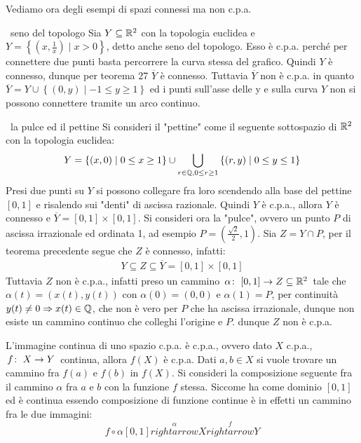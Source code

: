 Vediamo ora degli esempi di spazi connessi ma non c.p.a.
\begin{example}~{seno del topologo}
	Sia $Y\subseteq \mathbb{R}^2$ con la topologia euclidea e $Y=\left\{ \left( x, \frac{1}{x} \right) \mid x>0 \right\}$, detto anche seno del topologo. Esso è c.p.a. perché per connettere due punti basta percorrere la curva stessa del grafico. Quindi $Y$ è connesso, dunque per teorema 27 $\overline{Y}$ è connesso. 
	Tuttavia $\overline{Y}$ non è c.p.a. in quanto $\overline{Y}=Y\cup \left\{ (0,y) \mid -1\leq y \geq 1 \right\}$ ed i punti sull'asse delle y  e sulla curva $Y$ non si possono connettere tramite un arco continuo.
\end{example}
\begin{example}~{la pulce ed il pettine}
	Si consideri il "pettine" come il seguente sottospazio di $\mathbb{R} ^2$ con la topologia euclidea:
		\begin{equation*}
			Y= \left\{ (x,0) \mid 0\leq x\geq 1 \right\} \cup \mathop{{\bigcup}}\displaylimits_{r\in\mathbb{Q}, 0\leq r\geq 1} \left\{ (r,y) \mid 0\leq y \leq 1 \right\}
		\end{equation*}
	Presi due punti su $Y$ si possono collegare fra loro scendendo alla base del pettine $[0,1]$ e risalendo sui "denti" di ascissa razionale. Quindi $Y$ è c.p.a., allora $Y$ è connesso e $\overline{Y}=[0,1]\times [0,1]$.\newline 
	Si consideri ora la "pulce", ovvero un punto $P$ di ascissa irrazionale ed ordinata 1, ad esempio $P=\left(\frac{\sqrt{2}}{2}, 1\right)$. Sia $Z=Y\cap P$, per il teorema precedente segue che $Z$ è connesso, infatti:
		\begin{gather*}
			Y\subseteq Z \subseteq \overline{Y}=[0,1]\times [0,1]	
		\end{gather*}
	Tuttavia $Z$ non è c.p.a., infatti preso un cammino $\funz \alpha {[0,1]} {Z\subseteq \realset^2}$ tale che $\alpha(t)= \left( x(t), y(t)\right)$ con $\alpha (0)=(0,0)$ e $\alpha(1)=P$, per continuità $y(t)\neq 0 \Rightarrow x(t)\in\mathbb{Q}$, che non è vero per $P$ che ha ascissa irrazionale, dunque non esiste un cammino continuo che colleghi l'origine e $P$. dunque $Z$ non è c.p.a.
\end{example}

\begin{observe}
	L'immagine continua di uno spazio c.p.a. è c.p.a., ovvero dato $X$ c.p.a.,$\funz f X Y$ continua, allora $f(X)$ è c.p.a.\newline
	Dati $a,b\in X$ si vuole trovare un cammino fra $f(a)$ e $f(b)$ in $f(X)$. Si consideri la composizione seguente fra il cammino $\alpha$ fra $a$ e $b$ con la funzione $f$ stessa. Siccome ha come dominio $[0,1]$ ed è continua essendo composizione di funzione continue è in effetti un cammino fra le due immagini:
		\begin{equation*}
			f\circ\alpha [0,1]\stackrel{\alpha}{rightarrow}X\stackrel{f}{rightarrow}Y
		\end{equation*}
\end{observe}


